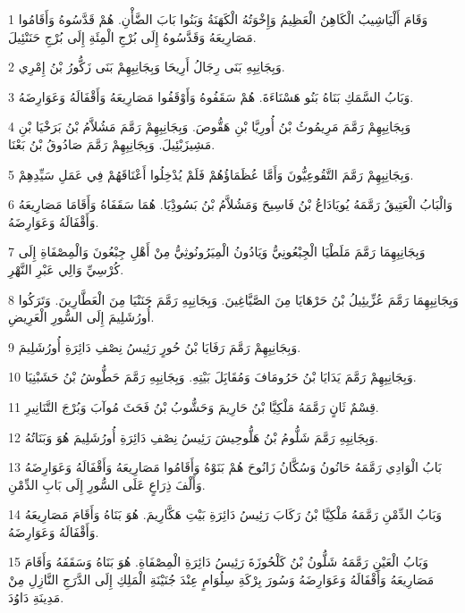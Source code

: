 \par 1 وَقَامَ أَلْيَاشِيبُ الْكَاهِنُ الْعَظِيمُ وَإِخْوَتُهُ الْكَهَنَةُ وَبَنُوا بَابَ الضَّأْنِ. هُمْ قَدَّسُوهُ وَأَقَامُوا مَصَارِيعَهُ وَقَدَّسُوهُ إِلَى بُرْجِ الْمِئَةِ إِلَى بُرْجِ حَنَنْئِيلَ.
\par 2 وَبِجَانِبِهِ بَنَى رِجَالُ أَرِيحَا وَبِجَانِبِهِمْ بَنَى زَكُّورُ بْنُ إِمْرِي.
\par 3 وَبَابُ السَّمَكِ بَنَاهُ بَنُو هَسْنَاءَةَ. هُمْ سَقَفُوهُ وَأَوْقَفُوا مَصَارِيعَهُ وَأَقْفَالَهُ وَعَوَارِضَهُ.
\par 4 وَبِجَانِبِهِمْ رَمَّمَ مَرِيمُوثُ بْنُ أُورِيَّا بْنِ هَقُّوصَ. وَبِجَانِبِهِمْ رَمَّمَ مَشُلاَّمُ بْنُ بَرَخْيَا بْنِ مَشِيزَبْئِيلَ. وَبِجَانِبِهِمْ رَمَّمَ صَادُوقُ بْنُ بَعْنَا.
\par 5 وَبِجَانِبِهِمْ رَمَّمَ التَّقُوعِيُّونَ وَأَمَّا عُظَمَاؤُهُمْ فَلَمْ يُدْخِلُوا أَعْنَاقَهُمْ فِي عَمَلِ سَيِّدِهِمْ.
\par 6 وَالْبَابُ الْعَتِيقُ رَمَّمَهُ يُويَادَاعُ بْنُ فَاسِيحَ وَمَشُلاَّمُ بْنُ بَسُودِْيَا. هُمَا سَقَفَاهُ وَأَقَامَا مَصَارِيعَهُ وَأَقْفَالَهُ وَعَوَارِضَهُ.
\par 7 وَبِجَانِبِهِمَا رَمَّمَ مَلَطْيَا الْجِبْعُونِيُّ وَيَادُونُ الْمِيَرُونُوثِيُّ مِنْ أَهْلِ جِبْعُونَ وَالْمِصْفَاةِ إِلَى كُرْسِيِّ وَالِي عَبْرِ النَّهْرِ.
\par 8 وَبِجَانِبِهِمَا رَمَّمَ عُزِّيئِيلُ بْنُ حَرْهَايَا مِنَ الصَّيَّاغِينَ. وَبِجَانِبِهِ رَمَّمَ حَنَنْيَا مِنَ الْعَطَّارِينَ. وَتَرَكُوا أُورُشَلِيمَ إِلَى السُّورِ الْعَرِيضِ.
\par 9 وَبِجَانِبِهِمْ رَمَّمَ رَفَايَا بْنُ حُورٍ رَئِيسُ نِصْفِ دَائِرَةِ أُورُشَلِيمَ.
\par 10 وَبِجَانِبِهِمْ رَمَّمَ يَدَايَا بْنُ حَرُومَافَ وَمُقَابَِلَ بَيْتِهِ. وَبِجَانِبِهِ رَمَّمَ حَطُّوشُ بْنُ حَشَبْنِيَا.
\par 11 قِسْمٌ ثَانٍ رَمَّمَهُ مَلْكِيَّا بْنُ حَارِيمَ وَحَشُّوبُ بْنُ فَحَثَ مُوآبَ وَبُرْجَ التَّنَانِيرِ.
\par 12 وَبِجَانِبِهِ رَمَّمَ شَلُّومُ بْنُ هَلُّوحِيشَ رَئِيسُ نِصْفِ دَائِرَةِ أُورُشَلِيمَ هُوَ وَبَنَاتُهُ.
\par 13 بَابُ الْوَادِي رَمَّمَهُ حَانُونُ وَسُكَّانُ زَانُوحَ هُمْ بَنَوْهُ وَأَقَامُوا مَصَارِيعَهُ وَأَقْفَالَهُ وَعَوَارِضَهُ وَأَلْفَ ذِرَاعٍ عَلَى السُّورِ إِلَى بَابِ الدِّمْنِ.
\par 14 وَبَابُ الدِّمْنِ رَمَّمَهُ مَلْكِيَّا بْنُ رَكَابَ رَئِيسُ دَائِرَةِ بَيْتِ هَكَّارِيمَ. هُوَ بَنَاهُ وَأَقَامَ مَصَارِيعَهُ وَأَقْفَالَهُ وَعَوَارِضَهُ.
\par 15 وَبَابُ الْعَيْنِ رَمَّمَهُ شَلُّونُ بْنُ كَلْحُوزَةَ رَئِيسُ دَائِرَةِ الْمِصْفَاةِ. هُوَ بَنَاهُ وَسَقَفَهُ وَأَقَامَ مَصَارِيعَهُ وَأَقْفَالَهُ وَعَوَارِضَهُ وَسُورَ بِرْكَةِ سِلُوَامٍ عِنْدَ جُنَيْنَةِ الْمَلِكِ إِلَى الدَّرَجِ النَّازِلِ مِنْ مَدِينَةِ دَاوُدَ.
